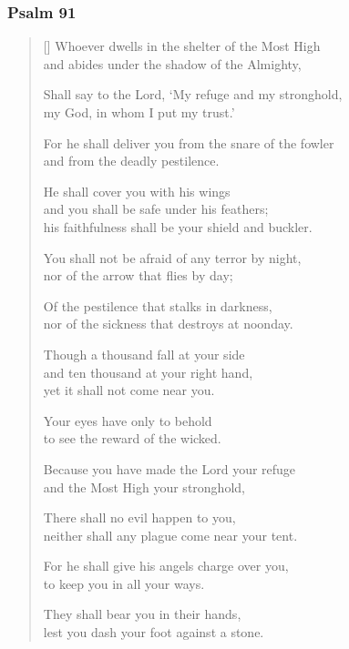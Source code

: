 \documentclass[12pt]{report}
\begin{document}
	\subsubsection*{Psalm 91}

	\begin{verse}[\versewidth]
		Whoever dwells in the shelter of the Most High \Pause\\
		and abides under the shadow of the Almighty,

		Shall say to the Lord, ‘My refuge and my stronghold, \Pause\\
		my God, in whom I put my trust.’

		For he shall deliver you from the snare of the fowler \Pause\\
		and from the deadly pestilence.

		He shall cover you with his wings\\
		\vin and you shall be safe under his feathers; \Pause\\
		his faithfulness shall be your shield and buckler.

		You shall not be afraid of any terror by night, \Pause\\
		nor of the arrow that flies by day;

		Of the pestilence that stalks in darkness, \Pause\\
		nor of the sickness that destroys at noonday.

		Though a thousand fall at your side\\
		\vin and ten thousand at your right hand, \Pause\\
		yet it shall not come near you.

		Your eyes have only to behold \Pause\\
		to see the reward of the wicked.

		Because you have made the Lord your refuge \Pause\\
		and the Most High your stronghold,

		There shall no evil happen to you, \Pause\\
		neither shall any plague come near your tent.

		For he shall give his angels charge over you, \Pause\\
		to keep you in all your ways.

		They shall bear you in their hands, \Pause\\
		lest you dash your foot against a stone.


\end{verse}
\end{document}
